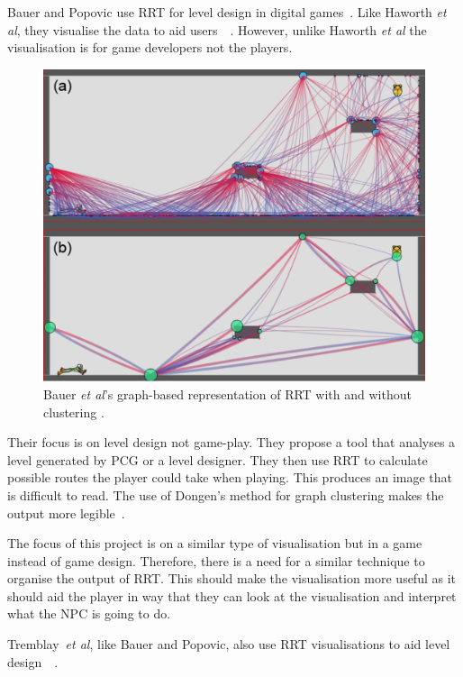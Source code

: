 \documentclass[journal]{IEEEtran}
\begin{document}
Bauer and Popovic use RRT for level design in digital games~\cite{bauer2012}. Like Haworth \textit{et al}, they visualise the data to aid users~\cite{bauer2012}~\cite{Haworth2010}. However, unlike Haworth \textit{et al} the visualisation is for game developers not the players. 

\begin{figure}[h]
	\includegraphics[width=1.0\linewidth]{BauerRRT.png}
	\caption{ Bauer \textit{et al}'s graph-based representation of RRT with and without clustering \cite{bauer2012}.}
	\label{BauerRRT}
\end{figure} 

Their focus is on level design not game-play. They propose a tool that analyses a level generated by PCG or a level designer. They then use RRT to calculate possible routes the player could take when playing.  
This produces an image that is difficult to read. The use of Dongen's method for graph clustering makes the output more legible~\cite{bauer2012, van2001}.  

The focus of this project is on a similar type of  visualisation but in a game instead of game design. Therefore, there is a need for a similar technique to organise the output of RRT.  This should make the visualisation  more useful as it should aid the player in way that they can look at the visualisation and interpret what the NPC is going to do. 


Tremblay~\textit{et al}, like Bauer and Popovic, also use RRT visualisations to aid level design~\cite{Tremblay2013}~\cite{bauer2012}. 
\end{document}
